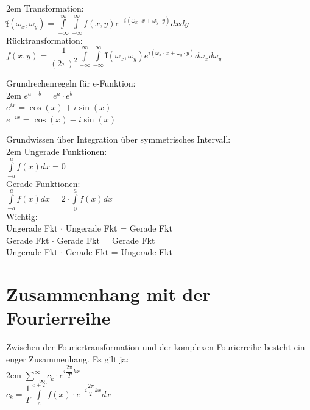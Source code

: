 \documentclass[11pt,final]{scrreprt}
\newcommand{\br} {\medskip\\}
\begin{document}
\begingroup
\leftskip2em 
Transformation:\\
 \^{f}$(\omega_x, \omega_y) = \int\limits_{-\infty}^{\infty} \int\limits_{-\infty}^{\infty} f(x, y) e^{-i(\omega_x \cdot x + \omega_y \cdot y)} dx dy $\\
Rücktransformation:\\
$ f(x,y) = \dfrac {1} {(2\pi)^2} \int\limits_{-\infty}^{\infty} \int\limits_{-\infty}^{\infty}$\^{f}$ (\omega_x, \omega_y) e^{i(\omega_x \cdot x + \omega_y \cdot y)} d\omega_x d\omega_y $\\
\par	
\endgroup 
\bigskip

Grundrechenregeln für e-Funktion:\\

\begingroup
\leftskip2em 
$ e^{a+b} = e^a \cdot e^b $\\
$ e^{ix} = \cos(x) + i\sin(x) $\\
$ e^{-ix} = \cos(x) - i\sin(x)  $\\
\par	
\endgroup 

Grundwissen über Integration über symmetrisches Intervall: \\

\begingroup
\leftskip2em 
Ungerade Funktionen:\\
$ \int\limits_{-a}^{a} f(x) dx = 0$\\
Gerade Funktionen:\\
$ \int\limits_{-a}^{a} f(x) dx = 2 \cdot\int\limits_{0}^{a} f(x) dx$\br
Wichtig:\\
Ungerade Fkt $\cdot$ Ungerade Fkt = Gerade Fkt\\
Gerade Fkt $\cdot$ Gerade Fkt = Gerade Fkt\\
Ungerade Fkt $\cdot$ Gerade Fkt = Ungerade Fkt\\
\par	
\endgroup 

\section{Zusammenhang mit der Fourierreihe}

Zwischen der Fouriertransformation und der komplexen Fourierreihe besteht ein enger Zusammenhang. Es gilt ja:\\

\begingroup
\leftskip2em 
$ \sum\limits_{-\infty}^{\infty} c_k \cdot e^{i\dfrac{2\pi}{T} kx} $\\
$ c_k = \dfrac{1}{T} \int\limits_{c}^{c+T} f(x) \cdot e^{-i\dfrac{2\pi}{T}kx} dx $\\
\par	
\endgroup 
\end{document}
